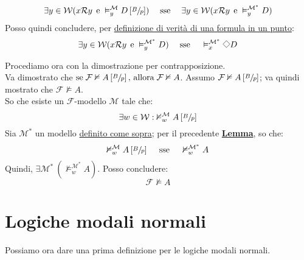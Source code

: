 \documentclass[a4paper,12pt]{article}
\newcommand{\Dmd}{\mathord{\vcenter{\hbox{\tikz[baseline=-0.6ex]{\draw[line width=0.4pt, scale=1, rotate=45] (0,0) rectangle (0.2,0.2);}}}}} %
\begin{document}
\begin{description}
\begin{dimo}
\begin{dimo}
\begin{description}
\begin{itemize}
					                  $$\exists y \in \mathcal{W} (x\mathcal{R}y \;\, \text{e} \; \vDash_y^{\mathcal{M}} D \left[\sfrac{B}{p}\right]) \quad\; \text{sse} \quad\; \exists y \in \mathcal{W} (x\mathcal{R}y \;\, \text{e} \; \vDash_y^{\mathcal{M^{\ast}}} D)$$
					                  Posso quindi concludere, per \hyperlink{defverp}{definizione di verità di una formula in un punto}:
					                  $$\exists y \in \mathcal{W} (x\mathcal{R}y \;\, \text{e} \; \vDash_y^{\mathcal{M^{\ast}}} D) \quad\; \text{sse} \quad\; \vDash_x^{\mathcal{M^{\ast}}} \Dmd D$$
				            \end{itemize}
			      \end{description}
			      \vspace*{-16pt} \raggedleft \qedhere
		      \end{dimo}
		      Procediamo ora con la dimostrazione per contrapposizione. \\
		      Va dimostrato che \emph{$\text{se} \; \mathcal{F} \nvDash A \left[\sfrac{B}{p}\right] \text{, allora} \; \mathcal{F} \nvDash A$}. Assumo $\mathcal{F} \nvDash A \left[\sfrac{B}{p}\right]$; va quindi mostrato che $\mathcal{F} \nvDash A$. \\
		      So che esiste un $\mathcal{F}$-modello $\mathcal{M}$ tale che:
		      $$\exists w \in \mathcal{W} : \; \nvDash_w^{\mathcal{M}} A \left[\sfrac{B}{p}\right]$$
		      Sia $\mathcal{M^{\ast}}$ un modello \hyperlink{mod*}{definito come sopra}; per il precedente \hyperlink{lemdif}{\textbf{Lemma}}, so che:
		      $$\nvDash_w^{\mathcal{M}} A \left[\sfrac{B}{p}\right] \quad\; \text{sse} \quad \; \nvDash_w^{\mathcal{M^{\ast}}} A $$
		      Quindi, $\exists \mathcal{M^{\ast}} \: (\nvDash_w^{\mathcal{M^{\ast}}} A)$. Posso concludere: $$\mathcal{F} \nvDash A$$
	      \end{dimo}
\end{description}

\newpage
\section{Logiche modali normali}
\noindent Possiamo ora dare una prima definizione per le logiche modali normali. \\
\end{document}
